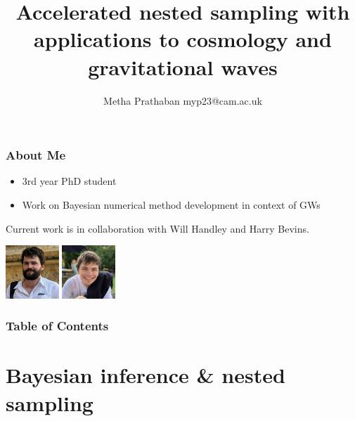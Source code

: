 \documentclass[aspectratio=169, 11pt]{beamer}
\title[Accelerated nested sampling with applications to cosmology and gravitational waves] %
{Accelerated nested sampling with applications to cosmology and gravitational waves}
\author[Metha Prathaban] %
{Metha Prathaban \break myp23@cam.ac.uk} %
\date{}
\def \bblock{\begin{beamerboxesrounded}[upper=uppercolor,lower=lowercolor,shadow=true]}
\def \eblock{\end{beamerboxesrounded}}
\begin{document}
\frame{\titlepage}
\begin{frame}
\frametitle{About Me}
\begin{itemize}
    \item 3rd year PhD student
    \item Work on Bayesian numerical method development in context of GWs
\end{itemize}
\vspace{2em}
\bblock{\begin{center}
Current work is in collaboration with Will Handley and Harry Bevins.
\end{center}}
\begin{center}
\includegraphics[height=2.0cm]{Ca_Foscari Beamer/will_handley.jpg}
\includegraphics[height=2.0cm]{Ca_Foscari Beamer/harry_bevins.jpg}
\end{center}
\eblock
\end{frame}
\begin{frame}
\frametitle{Table of Contents}
\tableofcontents
\end{frame}


\section{Bayesian inference \& nested sampling}



    
\end{document}
